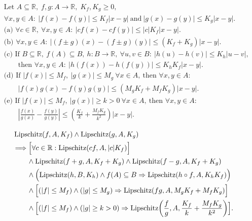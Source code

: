 \begin{remark*}
\[
\begin{aligned}
&\text{Let } A\subseteq\mathbb{R},\; f,g:A\to\mathbb{R},\; K_f,K_g\ge 0,\\
&\forall x,y\in A:\ |f(x)-f(y)|\le K_f|x-y|\ \text{and}\ |g(x)-g(y)|\le K_g|x-y|.\\
&\text{(a) }\forall c\in\mathbb{R},\ \forall x,y\in A:\ |cf(x)-cf(y)|\le |c|K_f|x-y|.\\
&\text{(b) }\forall x,y\in A:\ |(f\pm g)(x)-(f\pm g)(y)|\le (K_f+K_g)|x-y|.\\
&\text{(c) }\text{If }B\subseteq\mathbb{R},\ f(A)\subseteq B,\ h:B\to\mathbb{R},\ \forall u,v\in B:\ |h(u)-h(v)|\le K_h|u-v|,\\
&\qquad\text{then }\forall x,y\in A:\ |h(f(x))-h(f(y))|\le K_hK_f|x-y|.\\
&\text{(d) }\text{If }|f(x)|\le M_f,\ |g(x)|\le M_g\ \forall x\in A,\ \text{then } \forall x,y\in A:\\
&\qquad |f(x)g(x)-f(y)g(y)|\le (M_gK_f+M_fK_g)|x-y|.\\
&\text{(e) }\text{If }|f(x)|\le M_f,\ |g(x)|\ge k>0\ \forall x\in A,\ \text{then }\forall x,y\in A:\\
&\qquad \left|\frac{f(x)}{g(x)}-\frac{f(y)}{g(y)}\right|\le \left(\frac{K_f}{k}+\frac{M_fK_g}{k^2}\right)|x-y|.
\end{aligned}
\]
\end{remark*}

\begin{remark*}
\[
\begin{aligned}
&\operatorname{Lipschitz}(f,A,K_f)\land \operatorname{Lipschitz}(g,A,K_g) \\
&\Longrightarrow \Bigl[\forall c\in\mathbb{R}:\operatorname{Lipschitz}(cf,A,|c|K_f)\Bigr]\\
&\qquad\land \operatorname{Lipschitz}(f+g,A,K_f+K_g)\land \operatorname{Lipschitz}(f-g,A,K_f+K_g)\\
&\qquad\land \Bigl(\operatorname{Lipschitz}(h,B,K_h)\land f(A)\subseteq B\Rightarrow \operatorname{Lipschitz}(h\circ f,A,K_hK_f)\Bigr)\\
&\qquad\land \Bigl[(|f|\le M_f)\land(|g|\le M_g)\Rightarrow \operatorname{Lipschitz}(fg,A,M_gK_f+M_fK_g)\Bigr]\\
&\qquad\land \Bigl[(|f|\le M_f)\land(|g|\ge k>0)\Rightarrow \operatorname{Lipschitz}\!\left(\frac{f}{g},A,\frac{K_f}{k}+\frac{M_fK_g}{k^2}\right)\Bigr].
\end{aligned}
\]
\end{remark*}


